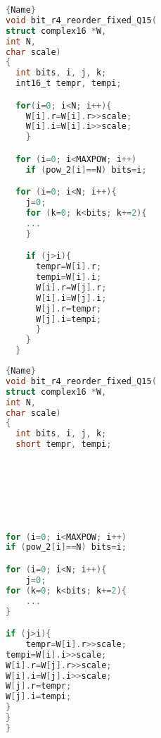\documentclass[a4paper]{article}
\begin{document}
\noindent\begin{minipage}{.45\textwidth}
    \begin{lstlisting}[caption=code 4,frame=tlrb, language=C]{Name}
void bit_r4_reorder_fixed_Q15(
struct complex16 *W,
int N,
char scale)
{
  int bits, i, j, k;
  int16_t tempr, tempi;

  for(i=0; i<N; i++){
    W[i].r=W[i].r>>scale;
	W[i].i=W[i].i>>scale;
	}

  for (i=0; i<MAXPOW; i++)
  	if (pow_2[i]==N) bits=i;

  for (i=0; i<N; i++){
  	j=0;
   	for (k=0; k<bits; k+=2){
   	...
   	}

	if (j>i){
	  tempr=W[i].r;
	  tempi=W[i].i;
	  W[i].r=W[j].r;
	  W[i].i=W[j].i;
	  W[j].r=tempr;
	  W[j].i=tempi;
	  }
	}
  }
    \end{lstlisting}
\end{minipage}\hfill
\begin{minipage}{.45\textwidth}
    \begin{lstlisting}[caption=code 5,frame=tlrb, language=C]{Name}
void bit_r4_reorder_fixed_Q15(
struct complex16 *W,
int N,
char scale)
{
  int bits, i, j, k;
  short tempr, tempi;







for (i=0; i<MAXPOW; i++)
if (pow_2[i]==N) bits=i;

for (i=0; i<N; i++){
    j=0;
for (k=0; k<bits; k+=2){
    ...
}

if (j>i){
    tempr=W[i].r>>scale;
tempi=W[i].i>>scale;
W[i].r=W[j].r>>scale;
W[i].i=W[j].i>>scale;
W[j].r=tempr;
W[j].i=tempi;
}
}
}

    \end{lstlisting}
\end{minipage}
\end{document}
